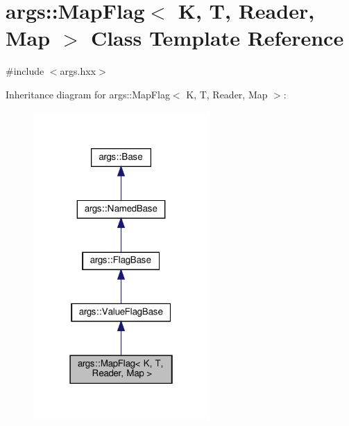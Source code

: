 \hypertarget{classargs_1_1_map_flag}{}\section{args\+:\+:Map\+Flag$<$ K, T, Reader, Map $>$ Class Template Reference}
\label{classargs_1_1_map_flag}


{\ttfamily \#include $<$args.\+hxx$>$}



Inheritance diagram for args\+:\+:Map\+Flag$<$ K, T, Reader, Map $>$\+:\nopagebreak
\begin{figure}[H]
\begin{center}
\leavevmode
\includegraphics[width=190pt]{classargs_1_1_map_flag__inherit__graph}
\end{center}
\end{figure}


